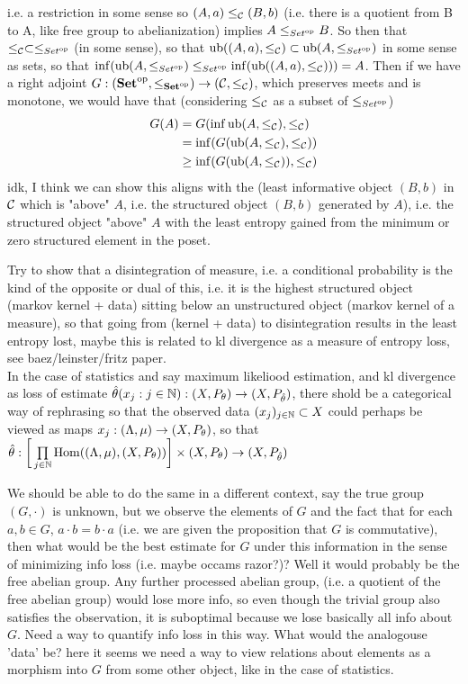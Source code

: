 \documentclass{book}
\begin{document}
	i.e. a restriction in some sense so $(A,a) \leq_{\mathcal{C}} (B,b)$ (i.e. there is a quotient from B to A, like free group to abelianization) implies $A \leq_{{Set}^{\text{op}}} B$. So then that $\leq_{\mathcal{C}} \subset \leq_{{Set}^{\text{op}}}$ (in some sense), so that $\operatorname{ub}((A, a), \leq_{\mathcal{C}}) \subset \operatorname{ub}(A, \leq_{{Set}^{\text{op}}})$ in some sense as sets, so that $\inf( \operatorname{ub}(A, \leq_{{Set}^{\text{op}}}) \leq_{{Set}^{\text{op}}} \inf( \operatorname{ub}((A, a), \leq_{\mathcal{C}}))) = A$. Then if we have a right adjoint $G: ({\text{\textbf{Set}}}^{\text{op}}, \leq_{{\text{\textbf{Set}}}^{\text{op}}}) \rightarrow (\mathcal{C}, \leq_{\mathcal{C}})$, which preserves meets and is monotone, we would have that (considering $\leq_{\mathcal{C}}$ as a subset of $\leq_{{Set}^{\text{op}}}$)
	\begin{align*}
		G(A)
		& = G(\inf \operatorname{ub}(A, \leq_{\mathcal{C}}), \leq_{\mathcal{C}}) \\
		& = \inf (G(\operatorname{ub}(A, \leq_{\mathcal{C}}), \leq_{\mathcal{C}})) \\
		& \geq \inf (G (\operatorname{ub}(A, \leq_{\mathcal{C}})), \leq_{\mathcal{C}})
	\end{align*}
	idk, I think we can show this aligns with the (least informative object $(B,b)$ in $\mathcal{C}$ which is "above" $A$, i.e. the structured object $(B,b)$ generated by $A$), i.e. the structured object "above" $A$ with the least entropy gained from the minimum or zero structured element in the poset.
	
	Try to show that a disintegration of measure, i.e. a conditional probability is the kind of the opposite or dual of this, i.e. it is the highest structured object (markov kernel + data) sitting below an unstructured object (markov kernel of a measure), so that going from (kernel + data) to disintegration results in the least entropy lost, maybe this is related to kl divergence as a measure of entropy loss, see baez/leinster/fritz paper.  \\
	
	In the case of statistics and say maximum likeliood estimation, and kl divergence as loss of estimate $\hat{\theta}(x_j:j \in \mathbb{N}):(X, P_{\theta}) \rightarrow (X, P_{\hat{\theta}})$, there shold be a categorical way of rephrasing so that the observed data $(x_j)_{j \in \mathbb{N}} \subset X$ could perhaps be viewed as maps $x_j:(\Lambda, \mu) \rightarrow (X, P_{\theta})$, so that $\hat{\theta}: \bigg[ \prod\limits_{j \in \mathbb{N}} \operatorname{Hom}((\Lambda, \mu), (X, P_{\theta})) \bigg] \times (X, P_{\theta}) \rightarrow (X, P_{\hat{\theta}})$
	
	We should be able to do the same in a different context, say the true group $(G, \cdot)$ is unknown, but we observe the elements of $G$ and the fact that for each $a,b \in G$, $a \cdot b = b \cdot a$ (i.e. we are given the proposition that $G$ is commutative), then what would be the best estimate for $G$ under this information in the sense of minimizing info loss (i.e. maybe occams razor?)? Well it would probably be the free abelian group. Any further processed abelian group, (i.e. a quotient of the free abelian group) would lose more info, so even though the trivial group also satisfies the observation, it is suboptimal because we lose basically all info about $G$. Need a way to quantify info loss in this way. What would the analogouse 'data' be? here it seems we need a way to view relations about elements as a morphism into $G$ from some other object, like in the case of statistics.
	
\end{document}
